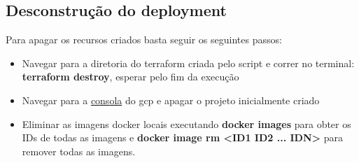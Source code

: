 \documentclass[11pt,a4paper]{article}
\begin{document}
\subsection{Desconstrução do deployment}
Para apagar os recursos criados basta seguir os seguintes passos:
\begin{itemize}
	\item Navegar para a diretoria do terraform criada pelo script e correr no terminal: \textbf{terraform destroy}, esperar pelo fim da execução
	\item Navegar para a \href{http://console.cloud.google.com/}{consola} do gcp e apagar o projeto inicialmente criado
	\item Eliminar as imagens docker locais executando \textbf{docker images} para obter os IDs de todas as imagens e \textbf{docker image rm <ID1 ID2 ... IDN>} para remover todas as imagens. 
\end{itemize}
\end{document}
